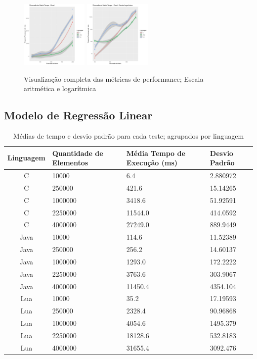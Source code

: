 \documentclass[11pt]{article}
\begin{document}
\begin{figure}[!ht]
    \centering
    \includegraphics[width =0.29\textwidth]{plot_geral.png}
    \includegraphics[width =0.29\textwidth]{plot_log.png}
    \caption{Visualização completa das métricas de performance; Escala
    aritmética e logarítmica}
\end{figure}

\newpage
\subsection{Modelo de Regressão Linear}

\begin{table}[!ht]
\centering
\begin{tabular}{|c|l|l|l|}
    \hline
    Linguagem & Quantidade de Elementos & Média Tempo de Execução (ms) & Desvio
    Padrão\\
    \hline
    C & 10000 & 6.4 & 2.880972\\
    \hline
    C & 250000 & 421.6 & 15.14265\\
    \hline
    C & 1000000 & 3418.6 & 51.92591\\
    \hline
    C & 2250000 & 11544.0 & 414.0592\\
    \hline
    C & 4000000 & 27249.0 & 889.9449\\
    \hline
    Java & 10000 & 114.6 & 11.52389\\
    \hline
    Java & 250000 & 256.2 & 14.60137\\
    \hline
    Java & 1000000 & 1293.0 & 172.2222\\
    \hline
    Java & 2250000 & 3763.6 & 303.9067\\
    \hline
    Java & 4000000 & 11450.4 & 4354.104\\
    \hline
    Lua & 10000 & 35.2 & 17.19593\\
    \hline
    Lua & 250000 & 2328.4 & 90.96868\\
    \hline
    Lua & 1000000 & 4054.6 & 1495.379\\
    \hline
    Lua & 2250000 & 18128.6 & 532.8183\\
    \hline
    Lua & 4000000 & 31655.4 & 3092.476\\
    \hline
\end{tabular}
\caption{Médias de tempo e desvio padrão para cada teste; agrupados por
    linguagem}
\end{table}
\end{document}
